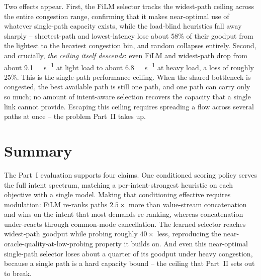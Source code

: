 Two effects appear. First, the FiLM selector tracks the widest-path ceiling across the entire congestion
range, confirming that it makes near-optimal use of whatever single-path capacity exists, while the
load-blind heuristics fall away sharply -- shortest-path and lowest-latency lose about 58\% of their
goodput from the lightest to the heaviest congestion bin, and random collapses entirely. Second, and
crucially, \emph{the ceiling itself descends}: even FiLM and widest-path drop from about
\SI{9.1}{\giga\bit\per\second} at light load to about \SI{6.8}{\giga\bit\per\second} at heavy load, a
loss of roughly 25\%. This is the single-path performance ceiling. When the shared bottleneck is
congested, the best available path is still one path, and one path can carry only so much; no amount of
intent-aware selection recovers the capacity that a single link cannot provide. Escaping this ceiling
requires spreading a flow across several paths at once -- the problem Part~II takes up.

\section{Summary}
\label{sec:p1eval:summary}

The Part~I evaluation supports four claims. One conditioned scoring policy serves the full intent
spectrum, matching a per-intent-strongest heuristic on each objective with a single model. Making that
conditioning effective requires modulation: FiLM re-ranks paths $2.5\times$ more than value-stream
concatenation and wins on the intent that most demands re-ranking, whereas concatenation under-reacts
through common-mode cancellation. The learned selector reaches widest-path goodput while probing roughly
$40\times$ less, reproducing the near-oracle-quality-at-low-probing property it builds on. And even this
near-optimal single-path selector loses about a quarter of its goodput under heavy congestion, because a
single path is a hard capacity bound -- the ceiling that Part~II sets out to break.

